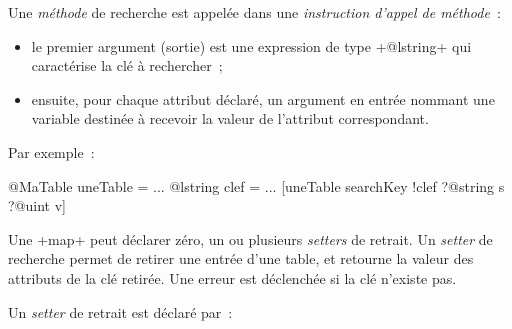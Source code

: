 Une \emph{méthode} de recherche est appelée dans une \emph{instruction d'appel de méthode}~:
\begin{itemize}
  \item le premier argument (sortie) est une expression de type \ggst+@lstring+ qui caractérise la clé à rechercher~;
  \item ensuite, pour chaque attribut déclaré, un argument en entrée nommant une variable destinée à recevoir la valeur de l'attribut correspondant.
\end{itemize}

Par exemple~:
\begin{galgas3}
@MaTable uneTable = {}
...
@lstring clef = ...
[uneTable searchKey !clef ?@string s ?@uint v]
\end{galgas3}


%
%
%
%
%








Une \ggst+map+ peut déclarer zéro, un ou plusieurs \emph{setters} de retrait. Un \emph{setter} de recherche permet de retirer une entrée d'une table, et retourne la valeur des attributs de la clé retirée. Une erreur est déclenchée si la clé n'existe pas.


Un \emph{setter} de retrait est déclaré par~:

